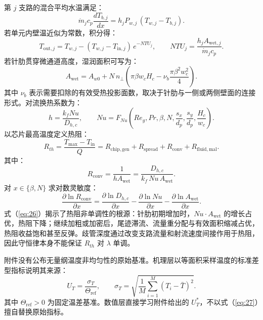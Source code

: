 \documentclass[12pt]{article}
\newcommand{\subsect}[1]{\par\vspace{6pt}\noindent{\fontsize{12pt}{17pt}\selectfont\hei #1}\par\vspace{2pt}}
\begin{document}
\subsect{5.1.4\quad 水侧换热网络与热阻}
第 $j$ 支路的混合平均水温满足：
\begin{equation}
  \dot m_j c_p \frac{dT_{b,j}}{dx} = h_j P_{w,j}\,(T_{w,j} - T_{b,j}).
  \label{eq:20}
\end{equation}
若单元内壁温近似为常数，积分得：
\begin{equation}
  T_{\mathrm{out},j} = T_{w,j} - (T_{w,j} - T_{\mathrm{in},j})\,e^{-NTU_j}, \qquad
  NTU_j = \frac{h_j A_{\mathrm{wet},j}}{\dot m_j c_p}.
  \label{eq:21}
\end{equation}
若针肋贯穿微通道高度，湿润面积可写为：
\begin{equation}
  A_{\mathrm{wet}} = A_{w0} + N\,n_\perp\left(\pi\beta w_c H_c - \nu_b\frac{\pi\beta^{2} w_c^{2}}{4}\right).
  \label{eq:22}
\end{equation}
其中 $\nu_b$ 表示需要扣除的有效受热投影面数，取决于针肋与一侧或两侧壁面的连接形式。对流换热系数为：
\begin{equation}
  h = \frac{k_f Nu}{D_{h,c}}, \qquad
  Nu = F_{Nu}\left(Re_g, Pr, \beta, N, \frac{s_x}{d_p}, \frac{s_y}{d_p}, \frac{H_c}{w_c}\right).
  \label{eq:23}
\end{equation}
以芯片最高温度定义热阻：
\begin{equation}
  R_{th} = \frac{T_{\max} - T_{\mathrm{in}}}{Q}
         = R_{\mathrm{chip,gen}} + R_{\mathrm{spread}} + R_{\mathrm{conv}} + R_{\mathrm{fluid,mal}}.
  \label{eq:24}
\end{equation}
其中：
\begin{equation}
  R_{\mathrm{conv}} = \frac{1}{h A_{\mathrm{wet}}} = \frac{D_{h,c}}{k_f\, Nu\, A_{\mathrm{wet}}}.
  \label{eq:25}
\end{equation}
对 $x \in \{\beta, N\}$ 求对数灵敏度：
\begin{equation}
  \frac{\partial \ln R_{\mathrm{conv}}}{\partial x}
  = \frac{\partial \ln D_{h,c}}{\partial x} - \frac{\partial \ln Nu}{\partial x} - \frac{\partial \ln A_{\mathrm{wet}}}{\partial x}.
  \label{eq:26}
\end{equation}
式（\ref{eq:26}）揭示了热阻非单调性的根源：针肋初期增加时，$Nu \cdot A_{\mathrm{wet}}$ 的增长占优，热阻下降；继续加粗或加密后，尾迹滞流、流量重分配与有效面积缩减占优，热阻收益饱和甚至反弹。歧管深度通过改变支路流量和射流速度间接作用于热阻，因此守恒律本身不能保证 $R_{th}$ 对 $\lambda$ 单调。

\subsect{5.1.5\quad 温度非均匀性}
附件没有公布无量纲温度非均匀性的原始基准。机理层以等面积采样温度的标准差型指标说明其来源：
\begin{equation}
  U_T = \frac{\sigma_T}{\Theta_{\mathrm{ref}}}, \qquad
  \sigma_T = \sqrt{\frac{1}{M}\sum_{i=1}^{M}(T_i - \bar T)^{2}}.
  \label{eq:27}
\end{equation}
其中 $\Theta_{\mathrm{ref}} > 0$ 为固定温差基准。数值层直接学习附件给出的 $U_T^{*}$，不以式（\ref{eq:27}）擅自替换原始指标。
\end{document}

